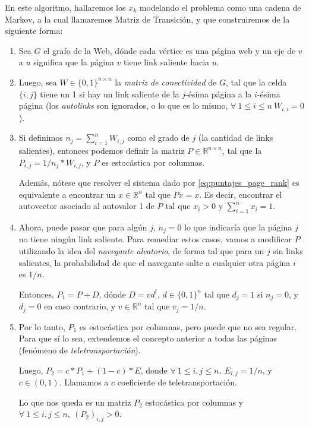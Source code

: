 En este algoritmo, hallaremos los $x_k$ modelando el problema como una cadena de
 Markov, a la cual llamaremos Matriz de Transición, y que construiremos de la siguiente forma:

\begin{enumerate}
	\item Sea $G$ el grafo de la Web, dónde cada vértice es una página web y un
		eje de $v$ a $u$ significa que la página $v$ tiene link saliente hacia $u$.
	\item Luego, sea $W\in\{0,1\}^{n \times n}$ la \textit{matriz de conectividad} de $G$, tal
        que la celda $\{i,j\}$ tiene un 1 si hay un link saliente de la $j$-ésima página
        a la $i$-ésima página (los \textit{autolinks} son ignorados, o lo que es lo mismo,
        $\forall\ 1\leq i\leq n\ W_{i,i}=0$).
	\item Si definimos $n_j = \sum\limits_{i=1}^{n}{W_{i,j}}$ como el grado de $j$
        (la cantidad de links salientes), entonces podemos definir la matriz
        $P\in\mathbb{R}^{n \times n}$, tal que la $P_{i,j} = 1/n_{j} * W_{i,j} $, y
        $P$ es estocástica por columnas.

        Además, nótese que resolver el sistema dado por \ref{eq:puntajes_page_rank}
        es equivalente a encontrar un $x\in\mathbb{R}^n$ tal que $Px=x$.
        Es decir, encontrar el autovector asociado al autovalor 1 de $P$ tal que
        $x_i > 0$ y $\sum\limits_{i=1}^{n}{x_i} = 1$.
    \item Ahora, puede pasar que para algún $j$, $n_j = 0$ lo que indicaría que
        la página $j$ no tiene ningún link saliente. Para remediar
        estos casos, vamos a modificar $P$ utilizando la idea del  \textit{navegante
        aleatorio}, de forma tal que para un $j$ sin links salientes, la probabilidad
        de que el navegante salte a cualquier otra página $i$ es $1/n$.

        Entonces, $P_{1} = P + D$, dónde $D = vd^{t}$, $d\in\{0,1\}^{n}$ tal que
        $d_j = 1$ si $n_j = 0$, y $d_j = 0$ en caso contrario, y $v\in\mathbb{R}^n$
         tal que $v_j = 1/n$.
    \item Por lo tanto, $P_{1}$ es estocástica por columnas, pero puede que no sea regular.
        Para que sí lo sea, extendemos el concepto anterior a todas las páginas
        (fenómeno de \textit{teletransportación}).

        Luego, $P_{2} = c*P_{1} + (1-c)*E$, donde $\forall\ 1\leq i,j\leq n,\ E_{i,j} = 1/n$,
        y $c\in(0,1)$. Llamamos a $c$ coeficiente de teletransportación.

        Lo que nos queda es un matriz $P_{2}$ estocástica por columnas y $\forall\ 1\leq i,j\leq n,\ (P_{2})_{i,j} > 0$.
\end{enumerate}

